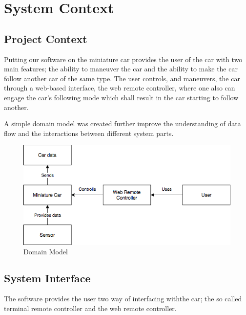 \documentclass[12pt]{article}
\begin{document}
\pagebreak

\section{System Context}   
\subsection{Project Context}
Putting our software on the miniature car provides the user of the car with two main features; the ability to maneuver the car and the ability to make the car follow another car of the same type. The user controls, and maneuvers, the car through a web-based interface, the web remote controller, where one also can engage the car's following mode which shall result in the car starting to follow another.

A simple domain model was created further improve the understanding of data flow and the interactions between different system parts. 
\FloatBarrier %
\begin{figure}
\centering
\includegraphics[width=\linewidth]{Diagrams/DomainModel.png}
\caption{Domain Model}
\label{fig:domainmodel}
\end{figure}
\FloatBarrier %

\subsection{System Interface}
The software provides the user two way of interfacing withthe car; the so called terminal remote controller and the web remote controller. 
\end{document}
